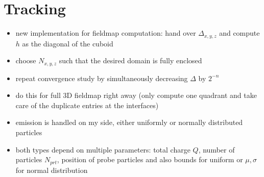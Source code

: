 \section{Tracking}
\begin{itemize}
  \item new implementation for fieldmap computation: hand over $\Delta_{x,y,z}$ and compute $h$ as the diagonal of the cuboid
  \item choose $N_{x,y,z}$ such that the desired domain is fully enclosed
  \item repeat convergence study by simultaneously decreasing $\Delta$ by $2^{-n}$

  \item do this for full 3D fieldmap right away (only compute one quadrant and take care of the duplicate entries at the interfaces)
\end{itemize}

\begin{itemize}
  \item emission is handled on my side, either uniformly or normally distributed particles
  \item both types depend on multiple parameters: total charge $Q$, number of particles $N_{prt}$, position of probe particles and also bounds for uniform or $\mu, \sigma$ for normal distribution
\end{itemize}

\begin{center}
\begin{figure}
  
\end{figure}
\end{center}
